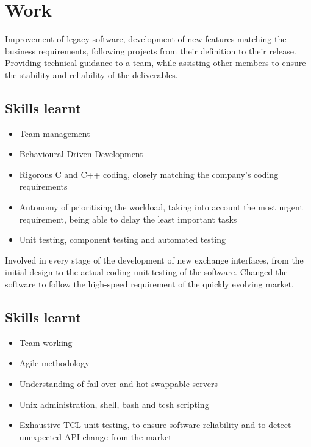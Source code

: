 \documentclass{cv}
\begin{document}
\iffalse
\contact{address line 1}
        {address line 2}
        {address line 3}
        {....@.........}
        {+phone~number}
\fi

\section{Work}
{Improvement of legacy software, development of new features matching the business requirements, following projects from their definition to their release. Providing technical guidance to a team, while assisting other members to ensure the stability and reliability of the deliverables.}
\subsection{Skills learnt}
\begin{itemize}
    \item {Team management}
    \item {Behavioural Driven Development}
    \item {Rigorous C and C++ coding, closely matching the company's coding requirements}
    \item {Autonomy of prioritising the workload, taking into account the most urgent requirement, being able to delay the least important tasks}
    \item {Unit testing, component testing and automated testing}
\end{itemize}

{Involved in every stage of the development of new exchange interfaces, from the initial design to the actual coding unit testing of the software.
Changed the software to follow the high-speed requirement of the quickly evolving market.}
\subsection{Skills learnt}
\begin{itemize}
    \item {Team-working}
    \item {Agile methodology}
    \item {Understanding of fail-over and hot-swappable servers}
    \item {Unix administration, shell, bash and tcsh scripting}
    \item {Exhaustive TCL unit testing, to ensure software reliability and to detect unexpected API change from the market}
\end{itemize}
\end{document}
